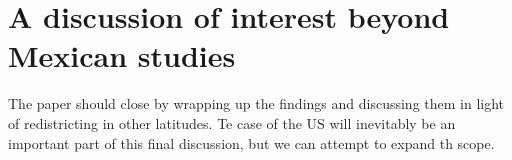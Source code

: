 \documentclass[12pt]{article}
\begin{document}
\section{A discussion of interest beyond Mexican studies}
\label{sec:org6b04b12}
The paper should close by wrapping up the findings and discussing them in light of redistricting in other latitudes. Te case of the US will inevitably be an important part of this final discussion, but we can attempt to expand th scope.
\end{document}
